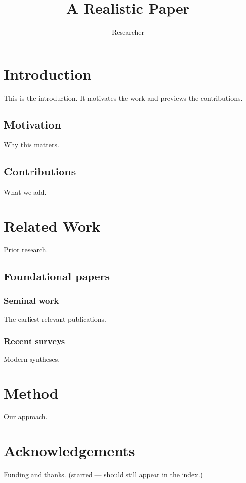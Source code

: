 \documentclass{article}
\title{A Realistic Paper}
\author{Researcher}
\begin{document}
\maketitle

\section{Introduction}
This is the introduction. It motivates the work and previews
the contributions.

\subsection{Motivation}
Why this matters.

\subsection{Contributions}
What we add.

\section{Related Work}
Prior research.

\subsection{Foundational papers}

\subsubsection{Seminal work}
The earliest relevant publications.

\subsubsection{Recent surveys}
Modern syntheses.

\section{Method}
Our approach.

\section*{Acknowledgements}
Funding and thanks. (starred — should still appear in the index.)
\end{document}
